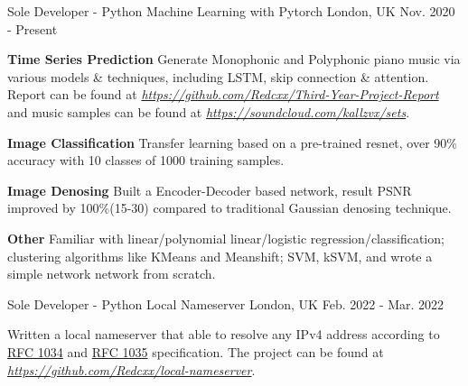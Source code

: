 \begin{cventries}
\begin{cventries}
  \cventry
    {Sole Developer - Python} %
    {Machine Learning with Pytorch} %
    {London, UK} %
    {Nov. 2020 - Present} %
    {
      \begin{cvitems} %
        \item {\textbf{Time Series Prediction} Generate Monophonic and Polyphonic piano music via various models \& techniques, including LSTM, skip connection \& attention. Report can be found at \href{https://github.com/Redcxx/Third-Year-Project-Report}{\textit{https://github.com/Redcxx/Third-Year-Project-Report}} and music samples can be found at \href{https://soundcloud.com/kallzvx/sets}{\textit{https://soundcloud.com/kallzvx/sets}}.}
        \item {\textbf{Image Classification} Transfer learning based on a pre-trained resnet, over 90\% accuracy with 10 classes of 1000 training samples.}
        \item {\textbf{Image Denosing} Built a Encoder-Decoder based network, result PSNR improved  by 100\%(15-30) compared to traditional Gaussian denosing technique.}
        \item {\textbf{Other} Familiar with linear/polynomial linear/logistic regression/classification; clustering algorithms like KMeans and Meanshift; SVM, kSVM, and wrote a simple network network from scratch.}
      \end{cvitems}
    }
    


  
  \cventry
    {Sole Developer - Python} %
    {Local Nameserver} %
    {London, UK} %
    {Feb. 2022 - Mar. 2022} %
    {
      \begin{cvitems} %
        \item {Written a local nameserver that able to resolve any IPv4 address according to \href{https://datatracker.ietf.org/doc/html/rfc1034}{RFC 1034} and \href{https://datatracker.ietf.org/doc/html/rfc1035}{RFC 1035} specification. The project can be found at \href{https://github.com/Redcxx/local-nameserver}{\textit{https://github.com/Redcxx/local-nameserver}}.}
      \end{cvitems}
    }
  

\end{cventries}
\end{cventries}
